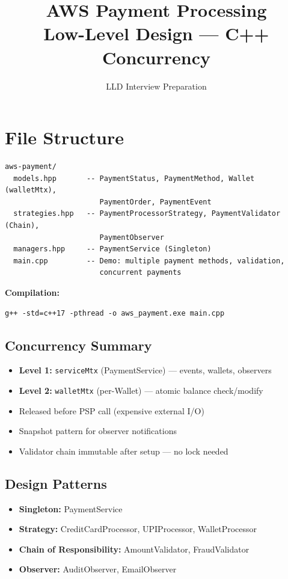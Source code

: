\documentclass[11pt,a4paper]{article}
\title{\Huge\textbf{AWS Payment Processing}\\[0.3em]\Large Low-Level Design --- C++ Concurrency}
\author{LLD Interview Preparation}
\date{}
\begin{document}
\maketitle
\tableofcontents
\newpage

\section{File Structure}
\begin{verbatim}
aws-payment/
  models.hpp       -- PaymentStatus, PaymentMethod, Wallet (walletMtx),
                      PaymentOrder, PaymentEvent
  strategies.hpp   -- PaymentProcessorStrategy, PaymentValidator (Chain),
                      PaymentObserver
  managers.hpp     -- PaymentService (Singleton)
  main.cpp         -- Demo: multiple payment methods, validation,
                      concurrent payments
\end{verbatim}

\textbf{Compilation:}
\begin{verbatim}
g++ -std=c++17 -pthread -o aws_payment.exe main.cpp
\end{verbatim}

\subsection{Concurrency Summary}
\begin{itemize}
    \item \textbf{Level 1:} \texttt{serviceMtx} (PaymentService) --- events, wallets, observers
    \item \textbf{Level 2:} \texttt{walletMtx} (per-Wallet) --- atomic balance check/modify
    \item Released before PSP call (expensive external I/O)
    \item Snapshot pattern for observer notifications
    \item Validator chain immutable after setup --- no lock needed
\end{itemize}

\subsection{Design Patterns}
\begin{itemize}
    \item \textbf{Singleton:} PaymentService
    \item \textbf{Strategy:} CreditCardProcessor, UPIProcessor, WalletProcessor
    \item \textbf{Chain of Responsibility:} AmountValidator, FraudValidator
    \item \textbf{Observer:} AuditObserver, EmailObserver
\end{itemize}
\end{document}
